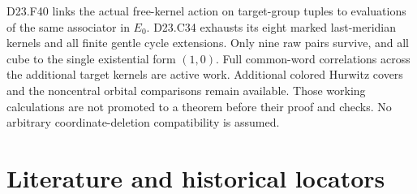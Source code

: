 \documentclass[11pt]{article}
\begin{document}
D23.F40 links the actual free-kernel action on target-group
tuples to evaluations of the same associator in $E_0$. D23.C34
exhausts its eight marked last-meridian kernels and all finite
gentle cycle extensions. Only nine raw pairs survive, and all
cube to the single existential form $(1,0)$. Full common-word
correlations across the additional target kernels are active work.
Additional colored Hurwitz covers and the noncentral orbital
comparisons remain available. Those working calculations are not
promoted to a theorem before their proof and checks. No arbitrary
coordinate-deletion compatibility is assumed.

\section{Literature and historical locators}
\small
\end{document}
